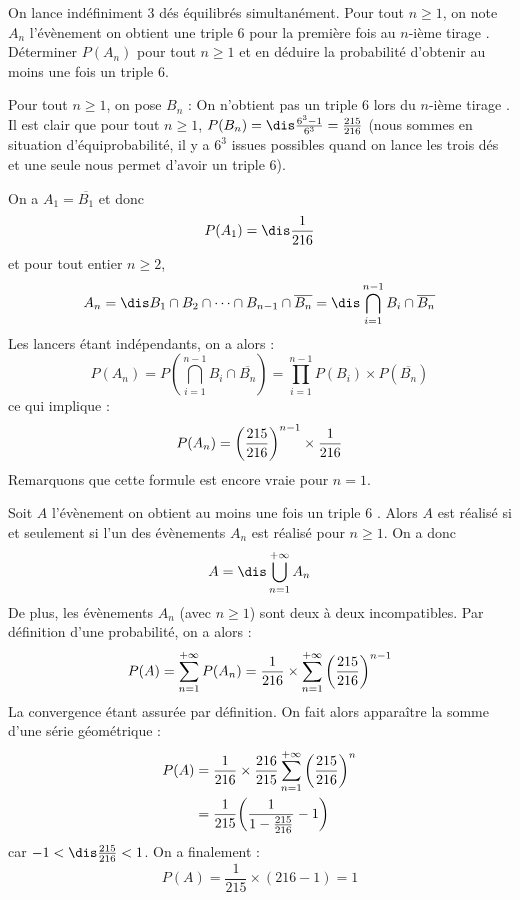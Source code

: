 \documentclass[a4paper,10pt]{report}
\begin{document}
\begin{Exercice}{} On lance indéfiniment 3 dés équilibrés simultanément. Pour tout $n \geq 1$, on note $A_n$ l'évènement \og on obtient une triple 6 pour la première fois au $n$-ième tirage \fg . Déterminer $P(A_n)$ pour tout $n \geq 1$ et en déduire la probabilité d'obtenir au moins une fois un triple $6$.
\end{Exercice}

\corr Pour tout $n \geq 1$, on pose $B_n$ : \og On n'obtient pas un triple 6 lors du $n$-ième tirage \fg . Il est clair que pour tout $n \geq 1$, $P(B_n) = \dis \frac{6^3-1}{6^3} = \frac{215}{216}$ (nous sommes en situation d'équiprobabilité, il y a $6^3$ issues possibles quand on lance les trois dés et une seule nous permet d'avoir un triple $6$).

\medskip

\noindent On a $A_1=\overline{B_1}$ et donc 
$$P(A_1) = \dis \frac{1}{216}$$
et pour tout entier $n \geq 2$, 
$$A_n = \dis B_1 \cap B_2 \cap \cdots \cap B_{n-1} \cap \overline{B_n} = \dis \bigcap_{i=1}^{n-1} B_i \cap \overline{B_n}$$
Les lancers étant indépendants, on a alors :
\[ P(A_n) = P(\bigcap_{i=1}^{n-1} B_i \cap \overline{B_n}) = \prod_{i=1}^{n-1} P(B_i) \times P( \overline{B_n})\]
ce qui implique :
\[ P(A_n) = \bigg{(} \frac{215}{216} \bigg{)}^{n-1} \times \frac{1}{216} \]
Remarquons que cette formule est encore vraie pour $n=1$.

\medskip
\noindent Soit $A$ l'évènement \og on obtient au moins une fois un triple $6$ \fg . Alors $A$ est réalisé si et seulement si l'un des évènements $A_n$ est réalisé pour $n \geq 1$. On a donc 
$$A= \dis \bigcup_{n=1}^{+ \infty} A_n$$
De plus, les évènements $A_n$ (avec $n \geq 1$) sont deux à deux incompatibles. Par définition d'une probabilité, on a alors :
\[ P(A) = \sum_{n=1}^{+ \infty} P(A_n) = \frac{1}{216} \times \sum_{n=1}^{+ \infty} \bigg{(} \frac{215}{216} \bigg{)}^{n-1} \]
La convergence étant assurée par définition. On fait alors apparaître la somme d'une série géométrique :
\begin{align*}
P(A) & = \frac{1}{216} \times \frac{216}{215} \sum_{n=1}^{+ \infty} \bigg{(} \frac{215}{216} \bigg{)}^{n} \\
& = \frac{1}{215} \bigg{(} \frac{1}{1-\frac{215}{216}} - 1 \bigg{)} 
\end{align*}
car $-1 < \dis \frac{215}{216} < 1$. On a finalement :
\[ P(A) = \frac{1}{215} \times (216-1) = 1 \]
\end{document}
